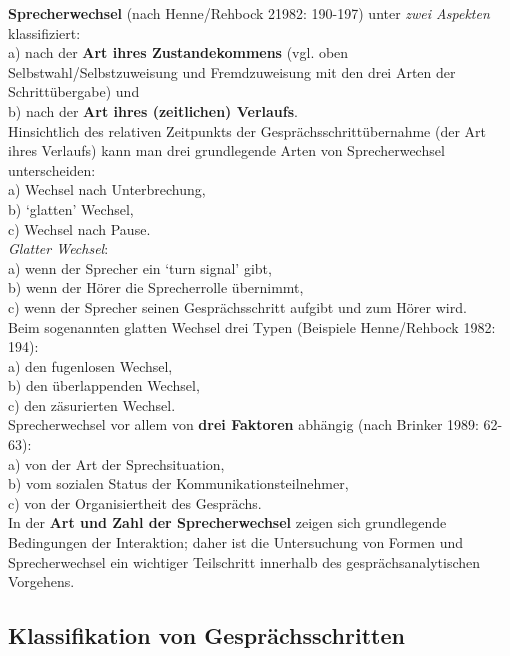 \documentclass[
  letterpaper,
]{scrbook}
\begin{document}
\textbf{Sprecherwechsel} (nach Henne/Rehbock 21982: 190-197) unter
\emph{zwei Aspekten} klassifiziert:\\
a) nach der \textbf{Art ihres Zustandekommens} (vgl. oben
Selbstwahl/Selbstzuweisung und Fremdzuweisung mit den drei Arten der
Schrittübergabe) und\\
b) nach der \textbf{Art ihres (zeitlichen) Verlaufs}.\\
Hinsichtlich des relativen Zeitpunkts der Gesprächsschrittübernahme (der
Art ihres Verlaufs) kann man drei grundlegende Arten von Sprecherwechsel
unterscheiden:\\
a) Wechsel nach Unterbrechung,\\
b) `glatten' Wechsel,\\
c) Wechsel nach Pause.\\

\emph{Glatter Wechsel}:\\
a) wenn der Sprecher ein `turn signal' gibt,\\
b) wenn der Hörer die Sprecherrolle übernimmt,\\
c) wenn der Sprecher seinen Gesprächsschritt aufgibt und zum Hörer
wird.\\

Beim sogenannten glatten Wechsel drei Typen (Beispiele Henne/Rehbock
1982: 194):\\
a) den fugenlosen Wechsel,\\
b) den überlappenden Wechsel,\\
c) den zäsurierten Wechsel.\\

Sprecherwechsel vor allem von \textbf{drei Faktoren} abhängig (nach
Brinker 1989: 62-63):\\
a) von der Art der Sprechsituation,\\
b) vom sozialen Status der Kommunikationsteilnehmer,\\
c) von der Organisiertheit des Gesprächs.\\

In der \textbf{Art und Zahl der Sprecherwechsel} zeigen sich
grundlegende Bedingungen der Interaktion; daher ist die Untersuchung von
Formen und Sprecherwechsel ein wichtiger Teilschritt innerhalb des
gesprächsanalytischen Vorgehens.

\hypertarget{klassifikation-von-gespruxe4chsschritten}{%
\subsection{Klassifikation von
Gesprächsschritten}\label{klassifikation-von-gespruxe4chsschritten}}
\end{document}

